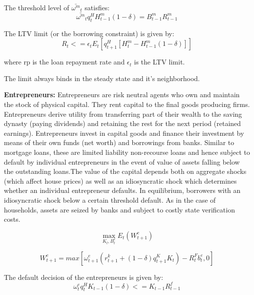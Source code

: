 \documentclass[12pt]{article}
\numberwithin{equation}{section}
\begin{document}
The threshold level of $\bar{\omega^m}_t$ satisfies:
\begin{equation}
\bar{\omega^m}_t q^H_{t} H^m_{t-1}(1-\delta) = B^m_{t-1}R^m_{t-1}
\end{equation}


The LTV limit (or the borrowing constraint) is given by:
\begin{equation}
[B^m_{t}-(1-rp)B^m_{t-1}]R_{t} <=\epsilon_{t} E_t[q^H_{t+1} [H^m_t-H^m_{t-1}(1-\delta)]]
\end{equation}

where rp is the loan repayment rate and $\epsilon_{t}$ is the LTV limit.

The limit always binds in the steady state and it's neighborhood.





\textbf{Entrepreneurs:}
Entrepreneurs are risk neutral agents who own and maintain the stock of physical capital. They rent  capital to the final goods producing firms. Entrepreneurs derive utility from transferring part of their wealth to the saving dynasty (paying dividends) and retaining the rest for the next period (retained earnings). Entrepreneurs invest in capital goods and finance their investment by means of their own funds (net worth) and borrowings from banks. Similar to mortgage loans, these are limited liability non-recourse loans and hence subject to default by individual entrepreneurs in the event of value of assets falling below the outstanding loans.The value of the capital depends both on aggregate shocks (which affect house prices) as well as an idiosyncratic shock which determines whether an individual entrepreneur defaults. In equilibrium, borrowers with an idiosyncratic shock below a certain threshold default.  As in the case of households, assets are seized by banks and subject to costly state verification costs. 

\begin{equation}
\max_{K_t,B^e_t}E_t(W^e_{t+1})
\end{equation}	


\begin{equation}
W^e_{t+1}=max[\omega^e_{t+1}(r^k_{t+1}+(1-\delta)q^K_{t+1}K_{t})-R^F_{t}b^e_{t},0]
\end{equation}


The default decision of the entrepreneurs is given by:
\begin{equation}
{{\omega^e_{t} }}q^H_{t} K_{t-1}(1-\delta) <= K_{t-1}R^f_{t-1}
\end{equation}
\end{document}
